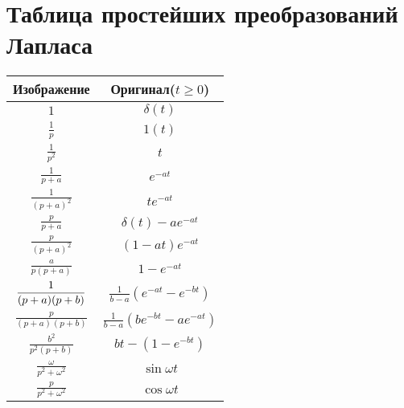 \documentclass[a4paper,14pt]{extarticle}
\theoremstyle{definition}
\begin{document}


% 


\section{Таблица простейших преобразований Лапласа}
\begin{center}
\renewcommand{\arraystretch}{1.7}
\begin{tabular}{| c | c |}
	\hline
	Изображение                         & Оригинал($\displaystyle t\geq0$)              \\[0.9em] \hline
	$\displaystyle1$			                                & $\displaystyle\delta(t)$                     \\ \hline
	$\displaystyle\frac1p$	                          & $\displaystyle1(t)$                          \\[0.9em] \hline
	$\displaystyle\frac{1}{p^2}$                     & $\displaystyle t$                              \\[0.9em] \hline
	$\displaystyle\frac{1}{p+a}$                     & $\displaystyle e^{-at}$                       \\[0.9em] \hline
	$\displaystyle\frac{1}{(p+a)^2}$                 & $\displaystyle te^{-at}$                      \\[0.9em] \hline
	$\displaystyle\frac{p}{p+a}$                     & $\displaystyle\delta(t)-ae^{-at}$            \\[0.9em] \hline
	$\displaystyle\frac{p}{(p+a)^2}$                 & $\displaystyle(1-at) e^{-at}$                \\[0.9em] \hline
	$\displaystyle\frac{a}{p(p+a)}$                  & $\displaystyle1-e^{-at}$                     \\[0.9em] \hline
	$\displaystyle\displaystyle\frac{1}{(p+a)(p+b)}$ & $\displaystyle\frac{1}{b-a} (e^{-at} -e^{-bt} ) $   \\[0.9em] \hline
	$\displaystyle\frac{p}{(p+a)(p+b)}$              & $\displaystyle\frac{1}{b-a} (be^{-bt} -ae^{-at} ) $ \\[0.9em] \hline
	$\displaystyle\frac{b^2}{p^2(p+b)}$              & $\displaystyle bt-(1-e^{-bt})$                \\[0.9em] \hline
	$\displaystyle\frac{\omega}{p^2+\omega^2}$       & $\displaystyle\sin{\omega t}$                \\[0.9em] \hline
	$\displaystyle\frac{p}{p^2+\omega^2}$            & $\displaystyle\cos{\omega t}$ 	            \\[0.9em] \hline
\end{tabular}
\end{center}
\newpage
\end{document}
